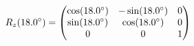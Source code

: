 \documentclass[preview]{standalone}
\begin{document}
\begin{align*}
\special{dvisvgm:raw <g id='unique000'>}R_z(18.0^\circ) = \begin{pmatrix} \cos(18.0^\circ) & -\sin(18.0^\circ) & 0 \\ \sin(18.0^\circ) & \cos(18.0^\circ) & 0 \\ 0 & 0 & 1 \end{pmatrix}\special{dvisvgm:raw </g>}
\end{align*}
\end{document}
